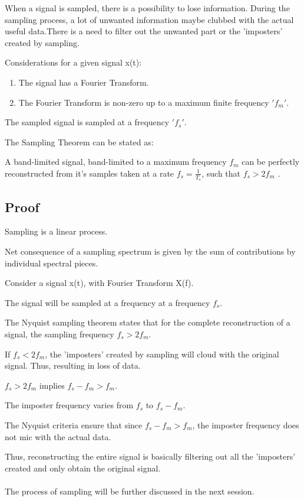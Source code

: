 When a signal is sampled, there is a possibility to lose information. During the sampling process, a lot of unwanted information maybe clubbed with the actual useful data.There is a need to filter out the unwanted part or the 'imposters' created by sampling.

Considerations for a given signal x(t):
\begin{enumerate}
\item The signal has a Fourier Transform.
\item The Fourier Transform is non-zero up to a maximum finite frequency $'f_m'$.
\end{enumerate}

The sampled signal is sampled at a frequency $'f_s'$.

The Sampling Theorem can be stated as:

A band-limited signal, band-limited to a maximum frequency $f_m$ can be perfectly reconstructed from it's samples taken at a rate $f_s=\frac{1}{T_s}$, such that $f_s>2f_m$ .

\subsection{Proof}


Sampling is a linear process.

Net consequence of a sampling spectrum is given by the sum of contributions by individual spectral pieces.

Consider a signal x(t), with Fourier Transform X(f).

The signal will be sampled at a frequency at a frequency $f_s$.

The Nyquist sampling theorem states that for the complete reconstruction of a signal, the sampling frequency $f_s>2f_m$.

If $f_s<2f_m$, the 'imposters' created by sampling will cloud with the original signal. Thus, resulting in loss of data. 

$f_s>2f_m$ implies $f_s-f_m>f_m$.

The imposter frequency varies from $f_s$ to $f_s-f_m$.

The Nyquist criteria ensure that since $f_s-f_m>f_m$, the imposter frequency does not mic with the actual data.

Thus, reconstructing the entire signal is basically filtering out all the 'imposters' created and only obtain the original signal.

\paragraph{}
The process of sampling will be further discussed in the next session.






